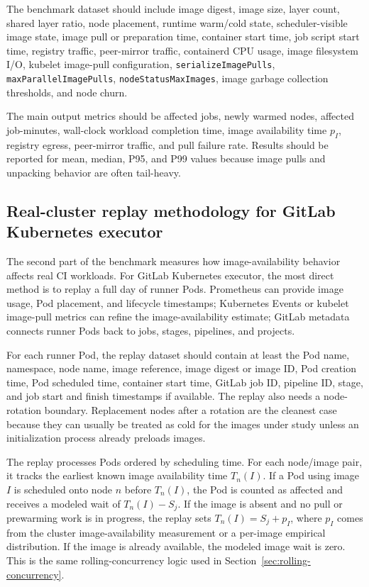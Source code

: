 \documentclass[11pt,a4paper]{article}
\begin{document}
The benchmark dataset should include image digest, image size, layer count, shared layer ratio, node placement, runtime warm/cold state, scheduler-visible image state, image pull or preparation time, container start time, job script start time, registry traffic, peer-mirror traffic, containerd CPU usage, image filesystem I/O, kubelet image-pull configuration, \texttt{serializeImagePulls}, \texttt{maxParallelImagePulls}, \texttt{nodeStatusMaxImages}, image garbage collection thresholds, and node churn.

The main output metrics should be affected jobs, newly warmed nodes, affected job-minutes, wall-clock workload completion time, image availability time \(p_I\), registry egress, peer-mirror traffic, and pull failure rate. Results should be reported for mean, median, P95, and P99 values because image pulls and unpacking behavior are often tail-heavy.

\subsection{Real-cluster replay methodology for GitLab Kubernetes executor}

The second part of the benchmark measures how image-availability behavior affects real CI workloads. For GitLab Kubernetes executor, the most direct method is to replay a full day of runner Pods. Prometheus can provide image usage, Pod placement, and lifecycle timestamps; Kubernetes Events or kubelet image-pull metrics can refine the image-availability estimate; GitLab metadata connects runner Pods back to jobs, stages, pipelines, and projects.

For each runner Pod, the replay dataset should contain at least the Pod name, namespace, node name, image reference, image digest or image ID, Pod creation time, Pod scheduled time, container start time, GitLab job ID, pipeline ID, stage, and job start and finish timestamps if available. The replay also needs a node-rotation boundary. Replacement nodes after a rotation are the cleanest case because they can usually be treated as cold for the images under study unless an initialization process already preloads images.

The replay processes Pods ordered by scheduling time. For each node/image pair, it tracks the earliest known image availability time \(T_n(I)\). If a Pod using image \(I\) is scheduled onto node \(n\) before \(T_n(I)\), the Pod is counted as affected and receives a modeled wait of \(T_n(I)-S_j\). If the image is absent and no pull or prewarming work is in progress, the replay sets \(T_n(I)=S_j+p_I\), where \(p_I\) comes from the cluster image-availability measurement or a per-image empirical distribution. If the image is already available, the modeled image wait is zero. This is the same rolling-concurrency logic used in Section~\ref{sec:rolling-concurrency}.
\end{document}
